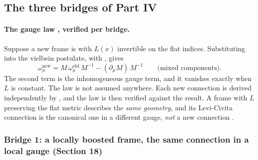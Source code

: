 \subsection{The three bridges of Part IV}
\label{csc:bridges}\label{sec:6.9}

\paragraph{The gauge law , verified per bridge.} Suppose a new frame is
 with $L(x)$ invertible on the flat indices. Substituting into the
vielbein postulate, with , gives
\begin{equation}
  \omega^{\text{new}}_\mu=M\,\omega^{\text{old}}_\mu\,M^{-1}-(\partial_\mu M)\,M^{-1}\qquad\text{(mixed components)}.
\end{equation}
The second term is the inhomogeneous gauge term, and it vanishes exactly when $L$ is constant.
The law is not assumed anywhere. Each new connection is derived independently by
, and the law is then verified against the result. A frame
 with $L$ preserving the flat metric describes the \emph{same geometry},
and its Levi-Civita connection is the canonical one in a different gauge, \emph{not} a new
connection .

\subsubsection{Bridge 1: a locally boosted frame, the same connection in a local gauge (Section 18)}
\label{sec:6.9.1}

